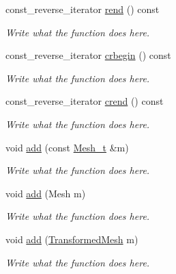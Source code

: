\begin{DoxyCompactItemize}
const\+\_\+reverse\+\_\+iterator \hyperlink{classMesh__t_a3aaf3274132f123097d88dd9f8ce36e1}{rend} () const 
\begin{DoxyCompactList}\small\item\em Write what the function does here. \end{DoxyCompactList}\item 
const\+\_\+reverse\+\_\+iterator \hyperlink{classMesh__t_a5ff640e5102a00e2af5b6f3865cead09}{crbegin} () const 
\begin{DoxyCompactList}\small\item\em Write what the function does here. \end{DoxyCompactList}\item 
const\+\_\+reverse\+\_\+iterator \hyperlink{classMesh__t_a2074b4e2fbbf02dbf10a12d829ff2f1b}{crend} () const 
\begin{DoxyCompactList}\small\item\em Write what the function does here. \end{DoxyCompactList}\item 
void \hyperlink{classMesh__t_aa48af5b6e9839dcd3f41b2b39776eec4}{add} (const \hyperlink{classMesh__t}{Mesh\+\_\+t} \&m)
\begin{DoxyCompactList}\small\item\em Write what the function does here. \end{DoxyCompactList}\item 
void \hyperlink{classMesh__t_a906dac79fb0a67cd3ed9da9fbb77c4e5}{add} (Mesh m)
\begin{DoxyCompactList}\small\item\em Write what the function does here. \end{DoxyCompactList}\item 
void \hyperlink{classMesh__t_ae0d0858511b1067029c77f5ecb0e48c9}{add} (\hyperlink{structTransformedMesh}{Transformed\+Mesh} m)
\begin{DoxyCompactList}\small\item\em Write what the function does here. \end{DoxyCompactList}\end{DoxyCompactItemize}
